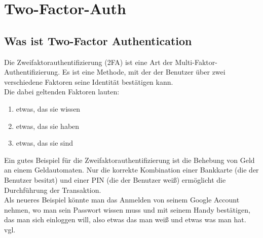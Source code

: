 \section{Two-Factor-Auth}
\label{sec:2fa}
\subsection{Was ist Two-Factor Authentication}
Die Zweifaktorauthentifizierung (2FA) ist eine Art der Multi-Faktor-Authentifizierung. Es ist eine Methode, mit der der Benutzer über zwei verschiedene Faktoren seine Identität bestätigen kann.\\
Die dabei geltenden Faktoren lauten:
\begin{enumerate}
\item etwas, das sie wissen
\item etwas, das sie haben
\item etwas, das sie sind
\end{enumerate}
Ein gutes Beispiel für die Zweifaktorauthentifizierung ist die Behebung von Geld an einem Geldautomaten. Nur die korrekte Kombination einer Bankkarte (die der Benutzer besitzt) und einer PIN (die der Benutzer weiß) ermöglicht die Durchführung der Transaktion.\\Als neueres Beispiel könnte man das Anmelden von seinem Google Account nehmen, wo man sein Passwort wissen muss und mit seinem Handy bestätigen, das man sich einloggen will, also etwas das man weiß und etwas was man hat. 
\\ vgl. \textcite{2FA}
